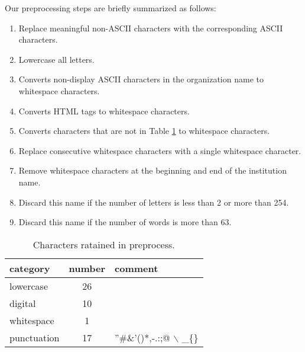 \documentclass{article}
\begin{document}
Our preprocessing steps are briefly summarized as follows:

\begin{enumerate}
    \item Replace meaningful non-ASCII characters with the corresponding ASCII characters.
    \item Lowercase all letters.
    \item Converts non-display ASCII characters in the organization name to whitespace characters.
    \item Converts HTML tags to whitespace characters.
    \item Converts characters that are not in Table \ref{tab:chars} to whitespace characters.
    \item Replace consecutive whitespace characters with a single whitespace character.
    \item Remove whitespace characters at the beginning and end of the institution name.
    \item Discard this name if the number of letters is less than 2 or more than 254.
    \item Discard this name if the number of words is more than 63.
\end{enumerate}




\begin{table}[h]
    \centering
    \begin{tabular}{l c l }
    \hline
    category&number& comment\\
    \hline
      lowercase  &  26  &  \\
        digital &  10  &  \\
      whitespace  &  1  &  \\
        punctuation &  17  &  ”\#\&’()*,-.:;@ $\backslash$ \_\{\}\\
    \hline
    \end{tabular}
\caption{Characters ratained in preprocess.}
\label{tab:chars}
\end{table}
\end{document}
